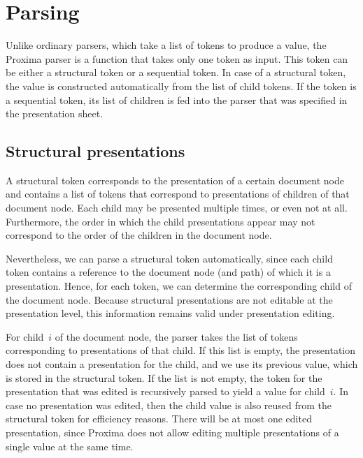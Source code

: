 \documentclass{article}[10pt]
\begin{document}
%
\section{Parsing}\label{sect:parser}
%

Unlike ordinary parsers, which take a list of tokens to produce a value, the Proxima parser is a function that takes only one token as input. This token can be either a structural token or a sequential token. In case of a structural token, the value is constructed automatically from the list of child tokens. If the token is a sequential token, its list of children is fed into the parser that was specified in the presentation sheet.

\subsection{Structural presentations}\label{subsect:parsingStructural}

A structural token corresponds to the presentation of a certain document node and contains a list of tokens that correspond to presentations of children of that document node. Each child may be presented multiple times, or even not at all. Furthermore, the order in which the child presentations appear may not correspond to the order of the children in the document node.

Nevertheless, we can parse a structural token automatically, since each child token contains a  reference to the document node (and path) of which it is a presentation. Hence, for each token, we can determine the corresponding child of the document node. Because structural presentations are not editable at the presentation level, this information remains valid under presentation editing.

For child~$i$ of the document node, the parser takes the list of tokens corresponding to presentations of that child. If this list is empty, the presentation does not contain a presentation for the child, and we use its previous value, which is stored in the structural token. If the list is not empty, the token for the presentation that was edited is recursively parsed to yield a value for child~$i$. In case no presentation was edited, then the child value is also reused from the structural token for efficiency reasons. There will be at most one edited presentation, since Proxima does not allow editing multiple presentations of a single value at the same time. 
\end{document}
